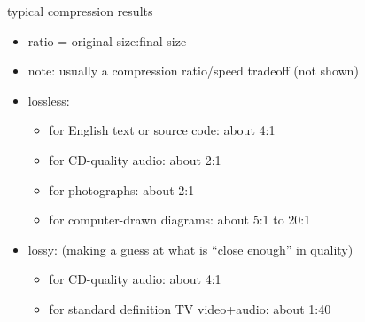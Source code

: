 \begin{frame}{typical compression results}
\begin{itemize}
\item ratio = original size:final size
\item note: usually a compression ratio/speed tradeoff (not shown)
\item lossless:
    \begin{itemize}
    \item for English text or source code: about 4:1
    \item for CD-quality audio: about 2:1
    \item for photographs: about 2:1
    \item for computer-drawn diagrams: about 5:1 to 20:1
    \end{itemize}
\item lossy: (making a guess at what is ``close enough'' in quality)
    \begin{itemize}
    \item for CD-quality audio: about 4:1
    \item for standard definition TV video+audio: about 1:40
    \end{itemize}
\end{itemize}
\end{frame}
